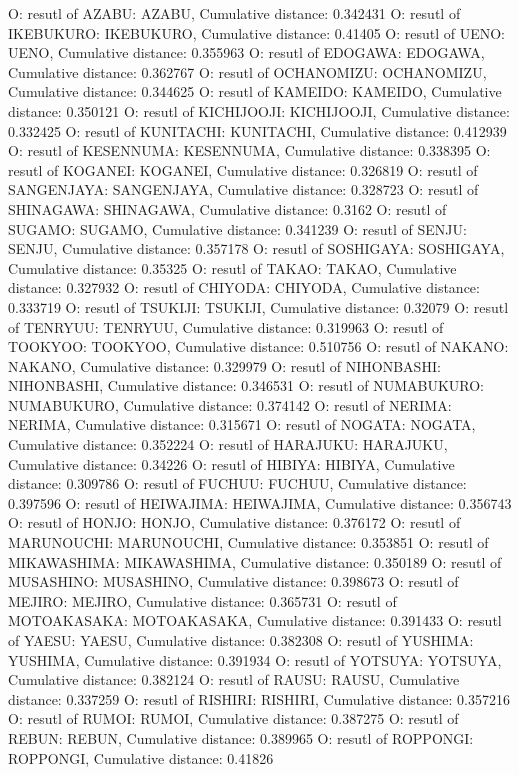 O: resutl of AZABU: AZABU, Cumulative distance: 0.342431
O: resutl of IKEBUKURO: IKEBUKURO, Cumulative distance: 0.41405
O: resutl of UENO: UENO, Cumulative distance: 0.355963
O: resutl of EDOGAWA: EDOGAWA, Cumulative distance: 0.362767
O: resutl of OCHANOMIZU: OCHANOMIZU, Cumulative distance: 0.344625
O: resutl of KAMEIDO: KAMEIDO, Cumulative distance: 0.350121
O: resutl of KICHIJOOJI: KICHIJOOJI, Cumulative distance: 0.332425
O: resutl of KUNITACHI: KUNITACHI, Cumulative distance: 0.412939
O: resutl of KESENNUMA: KESENNUMA, Cumulative distance: 0.338395
O: resutl of KOGANEI: KOGANEI, Cumulative distance: 0.326819
O: resutl of SANGENJAYA: SANGENJAYA, Cumulative distance: 0.328723
O: resutl of SHINAGAWA: SHINAGAWA, Cumulative distance: 0.3162
O: resutl of SUGAMO: SUGAMO, Cumulative distance: 0.341239
O: resutl of SENJU: SENJU, Cumulative distance: 0.357178
O: resutl of SOSHIGAYA: SOSHIGAYA, Cumulative distance: 0.35325
O: resutl of TAKAO: TAKAO, Cumulative distance: 0.327932
O: resutl of CHIYODA: CHIYODA, Cumulative distance: 0.333719
O: resutl of TSUKIJI: TSUKIJI, Cumulative distance: 0.32079
O: resutl of TENRYUU: TENRYUU, Cumulative distance: 0.319963
O: resutl of TOOKYOO: TOOKYOO, Cumulative distance: 0.510756
O: resutl of NAKANO: NAKANO, Cumulative distance: 0.329979
O: resutl of NIHONBASHI: NIHONBASHI, Cumulative distance: 0.346531
O: resutl of NUMABUKURO: NUMABUKURO, Cumulative distance: 0.374142
O: resutl of NERIMA: NERIMA, Cumulative distance: 0.315671
O: resutl of NOGATA: NOGATA, Cumulative distance: 0.352224
O: resutl of HARAJUKU: HARAJUKU, Cumulative distance: 0.34226
O: resutl of HIBIYA: HIBIYA, Cumulative distance: 0.309786
O: resutl of FUCHUU: FUCHUU, Cumulative distance: 0.397596
O: resutl of HEIWAJIMA: HEIWAJIMA, Cumulative distance: 0.356743
O: resutl of HONJO: HONJO, Cumulative distance: 0.376172
O: resutl of MARUNOUCHI: MARUNOUCHI, Cumulative distance: 0.353851
O: resutl of MIKAWASHIMA: MIKAWASHIMA, Cumulative distance: 0.350189
O: resutl of MUSASHINO: MUSASHINO, Cumulative distance: 0.398673
O: resutl of MEJIRO: MEJIRO, Cumulative distance: 0.365731
O: resutl of MOTOAKASAKA: MOTOAKASAKA, Cumulative distance: 0.391433
O: resutl of YAESU: YAESU, Cumulative distance: 0.382308
O: resutl of YUSHIMA: YUSHIMA, Cumulative distance: 0.391934
O: resutl of YOTSUYA: YOTSUYA, Cumulative distance: 0.382124
O: resutl of RAUSU: RAUSU, Cumulative distance: 0.337259
O: resutl of RISHIRI: RISHIRI, Cumulative distance: 0.357216
O: resutl of RUMOI: RUMOI, Cumulative distance: 0.387275
O: resutl of REBUN: REBUN, Cumulative distance: 0.389965
O: resutl of ROPPONGI: ROPPONGI, Cumulative distance: 0.41826
